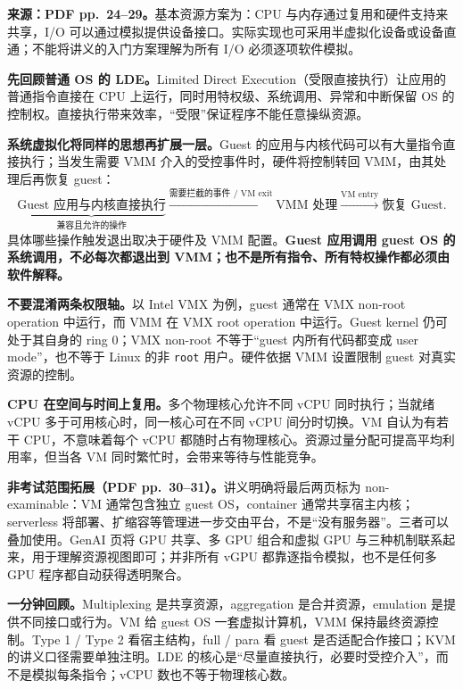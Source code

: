 
\textbf{来源：PDF pp.~24--29。}基本资源方案为：CPU 与内存通过复用和硬件支持来共享，I/O 可以通过模拟提供设备接口。实际实现也可采用半虚拟化设备或设备直通；不能将讲义的入门方案理解为所有 I/O 必须逐项软件模拟。

\textbf{先回顾普通 OS 的 LDE。}Limited Direct Execution（受限直接执行）让应用的普通指令直接在 CPU 上运行，同时用特权级、系统调用、异常和中断保留 OS 的控制权。直接执行带来效率，“受限”保证程序不能任意操纵资源。

\textbf{系统虚拟化将同样的思想再扩展一层。}Guest 的应用与内核代码可以有大量指令直接执行；当发生需要 VMM 介入的受控事件时，硬件将控制转回 VMM，由其处理后再恢复 guest：
\[
\underbrace{\text{Guest 应用与内核直接执行}}_{\text{兼容且允许的操作}}
\xrightarrow{\text{需要拦截的事件 / VM exit}}
\text{VMM 处理}
\xrightarrow{\text{VM entry}}
\text{恢复 Guest}.
\]
具体哪些操作触发退出取决于硬件及 VMM 配置。\textbf{Guest 应用调用 guest OS 的系统调用，不必每次都退出到 VMM；也不是所有指令、所有特权操作都必须由软件解释。}

\textbf{不要混淆两条权限轴。}以 Intel VMX 为例，guest 通常在 VMX non-root operation 中运行，而 VMM 在 VMX root operation 中运行。Guest kernel 仍可处于其自身的 ring 0；VMX non-root 不等于“guest 内所有代码都变成 user mode”，也不等于 Linux 的非 \texttt{root} 用户。硬件依据 VMM 设置限制 guest 对真实资源的控制。

\textbf{CPU 在空间与时间上复用。}多个物理核心允许不同 vCPU 同时执行；当就绪 vCPU 多于可用核心时，同一核心可在不同 vCPU 间分时切换。VM 自认为有若干 CPU，不意味着每个 vCPU 都随时占有物理核心。资源过量分配可提高平均利用率，但当各 VM 同时繁忙时，会带来等待与性能竞争。

\textbf{非考试范围拓展（PDF pp.~30--31）。}讲义明确将最后两页标为 non-examinable：VM 通常包含独立 guest OS，container 通常共享宿主内核；serverless 将部署、扩缩容等管理进一步交由平台，不是“没有服务器”。三者可以叠加使用。GenAI 页将 GPU 共享、多 GPU 组合和虚拟 GPU 与三种机制联系起来，用于理解资源视图即可；并非所有 vGPU 都靠逐指令模拟，也不是任何多 GPU 程序都自动获得透明聚合。

\textbf{一分钟回顾。}Multiplexing 是共享资源，aggregation 是合并资源，emulation 是提供不同接口或行为。VM 给 guest OS 一套虚拟计算机，VMM 保持最终资源控制。Type 1 / Type 2 看宿主结构，full / para 看 guest 是否适配合作接口；KVM 的讲义口径需要单独注明。LDE 的核心是“尽量直接执行，必要时受控介入”，而不是模拟每条指令；vCPU 数也不等于物理核心数。
